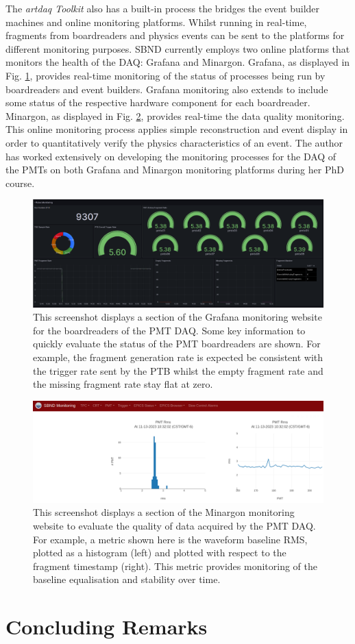 The \textit{artdaq Toolkit} also has a built-in process the bridges the event builder machines and online monitoring platforms.
Whilst running in real-time, fragments from boardreaders and physics events can be sent to the platforms for different monitoring purposes.
SBND currently employs two online platforms that monitors the health of the DAQ: Grafana and Minargon.
Grafana, as displayed in Fig. \ref{fig:Grafana}, provides real-time monitoring of the status of processes being run by boardreaders and event builders. 
Grafana monitoring also extends to include some status of the respective hardware component for each boardreader.
Minargon, as displayed in Fig. \ref{fig:Minargon}, provides real-time the data quality monitoring. 
This online monitoring process applies simple reconstruction and event display in order to quantitatively verify the physics characteristics of an event. 
The author has worked extensively on developing the monitoring processes for the DAQ of the PMTs on both Grafana and Minargon monitoring platforms during her PhD course. 

\begin{figure}[htbp!] 
\centering    
\includegraphics[width=1.0\textwidth]{Grafana}
\caption[Grafana]{
This screenshot displays a section of the Grafana monitoring website for the boardreaders of the PMT DAQ.
Some key information to quickly evaluate the status of the PMT boardreaders are shown.
For example, the fragment generation rate is expected be consistent with the trigger rate sent by the PTB whilst the empty fragment rate and the missing fragment rate stay flat at zero.
}
\label{fig:Grafana}
 \end{figure}

\begin{figure}[htbp!] 
\centering    
\includegraphics[width=1.0\textwidth]{Minargon}
\caption[Minargon]{
This screenshot displays a section of the Minargon monitoring website to evaluate the quality of data acquired by the PMT DAQ.
For example, a metric shown here is the waveform baseline RMS, plotted as a histogram (left) and plotted with respect to the fragment timestamp (right).
This metric provides monitoring of the baseline equalisation and stability over time.
}
\label{fig:Minargon}
\end{figure}

\section{Concluding Remarks}
